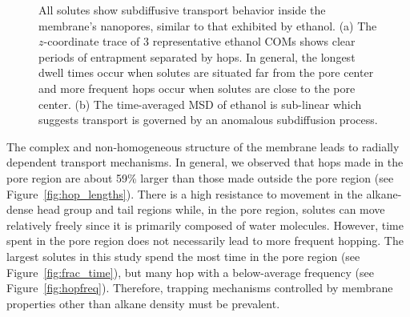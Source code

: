 \documentclass[journal=jpcbfk,manuscript=article]{achemso}
\begin{document}
\begin{figure}[!htb]
\begin{subfigure}{0.49\textwidth}
  \caption{}\label{fig:example_msd}
  \end{subfigure}
  \caption{All solutes show subdiffusive transport behavior inside the membrane's
  nanopores, similar to that exhibited by ethanol. (a) The $z$-coordinate trace of
  3 representative ethanol COMs shows clear periods of entrapment separated by hops.
  In general, the longest dwell times occur when solutes are situated far from the
  pore center and more frequent hops occur when solutes are close to the pore center.
  (b) The time-averaged MSD of ethanol is sub-linear which suggests transport is
  governed by an anomalous subdiffusion process.}\label{fig:qualitative_mechanisms}
  \end{figure}
  
  The complex and non-homogeneous structure of the membrane leads to radially
  dependent transport mechanisms. In general, we observed that hops 
  made in the pore region are about 59\% larger than those made outside
  the pore region (see Figure~\ref{fig:hop_lengths}). There is a high 
  resistance to movement in the alkane-dense head group and tail regions
  while, in the pore region, solutes can move relatively freely since it 
  is primarily composed of water molecules. However, time spent in the 
  pore region does not necessarily lead to more frequent hopping. The 
  largest solutes in this study spend the most time in the pore region
  (see Figure~\ref{fig:frac_time}), but many hop with a below-average
  frequency (see Figure~\ref{fig:hopfreq}). Therefore, trapping mechanisms
  controlled by membrane properties other than alkane density must be prevalent.

 
\end{document}
